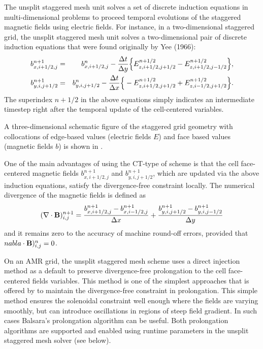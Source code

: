 The unsplit staggered mesh unit solves a set of discrete induction equations
in multi-dimensional problems to proceed
temporal evolutions of the staggered magnetic fields using electric
fields. For instance, in a two-dimensional staggered grid, the unsplit staggered mesh unit
solves a two-dimensional pair of discrete induction equations that were
found originally by Yee (1966):
\begin{eqnarray}
{b}^{n+1}_{x,i+{1}/{2},j}&=&
{b}^{n}_{x,i+{1}/{2},j}-
\frac{\Delta t}{\Delta y}
\Bigr\{
 {E}^{n+1/2}_{z,i+{1}/{2},j+{1}/{2}}
-{E}^{n+1/2}_{z,i+{1}/{2},j-{1}/{2}}
\Bigl\},
\label{Eqn:InductionBx2D}\\
{b}^{n+1}_{y,i,j+{1}/{2}}&=&
{b}^{n}_{y,i,j+{1}/{2}}-
\frac{\Delta t}{\Delta x}
\Bigr\{
-{E}^{n+1/2}_{z,i+{1}/{2},j+{1}/{2}}
+{E}^{n+1/2}_{z,i-{1}/{2},j+{1}/{2}}
\Bigl\}.
\label{Eqn:InductionBy2D}
\end{eqnarray}
The superindex $n+1/2$ in the above equations
simply indicates an intermediate timestep right
after the temporal update of the cell-centered variables.

A three-dimensional schematic figure of the staggered grid geometry
with collocations of edge-based values (electric fields $E$) and
face based values (magnetic fields $b$) is shown
in .

One of the main advantages of using the CT-type of scheme is that
the cell face-centered magnetic fields ${b}^{n+1}_{x,i+{1}/{2},j}$
and ${b}^{n+1}_{y,i,j+{1}/{2}}$, which are updated via the above induction
equations, satisfy the divergence-free constraint locally.
The numerical divergence of the magnetic fields is defined as
\begin{equation}
(\nabla\cdot\textbf{B})^{n+1}_{i,j}=
\frac{{b}^{n+1}_{x,i+{1}/{2},j}-{b}^{n+1}_{x,i-{1}/{2},j} }{\Delta x}+
\frac{{b}^{n+1}_{y,i,j+{1}/{2}}-{b}^{n+1}_{y,i,j-{1}/{2}} }{\Delta y}
\label{Eqn:DivBconstraint}
\end{equation}
and it remains zero to the accuracy of machine round-off errors,
provided that $nabla\cdot\textbf{B})^{n}_{i,j}=0$.

On an AMR grid, the unsplit staggered mesh scheme uses a direct injection method as a default
to preserve divergence-free prolongation to the cell face-centered fields variables. 
This method is one of the simplest approaches that is offered by  to maintain
the divergence-free constraint in prolongation. This simple method
ensures the solenoidal constraint well enough where the fields are varying
smoothly, but can introduce oscillations in regions of steep field
gradient. In such cases Balsara's prolongation algorithm can be useful. Both
prolongation algorithms are supported and enabled using runtime parameters
in the unsplit staggered mesh solver (see  below).

